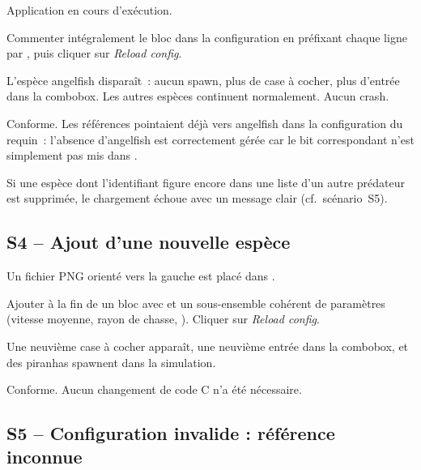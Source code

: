 \begin{description}[leftmargin=3em]
  \item[Préconditions.] Application en cours d'exécution.
  \item[Action.] Commenter intégralement le bloc
    \code{[[species]]}  dans la
    configuration en préfixant chaque ligne par \code{\#},
    puis cliquer sur \emph{Reload config}.
  \item[Attendu.] L'espèce angelfish disparaît~: aucun spawn,
    plus de case à cocher, plus d'entrée dans la combobox.
    Les autres espèces continuent normalement. Aucun crash.
  \item[Observé.] Conforme. Les références 
    pointaient déjà vers angelfish dans la configuration du
    requin~: l'absence d'angelfish est correctement gérée
    car le bit correspondant n'est simplement pas mis dans
    .
  \item[Note.] Si une espèce dont l'identifiant figure encore
    dans une liste  d'un autre prédateur est
    supprimée, le chargement échoue avec un message clair (cf.\
    scénario~S5).
\end{description}

\subsection{S4 -- Ajout d'une nouvelle espèce}

\begin{description}[leftmargin=3em]
  \item[Préconditions.] Un fichier PNG 
    orienté vers la gauche est placé dans .
  \item[Action.] Ajouter à la fin de  un
    bloc \code{[[species]]} avec  et un
    sous-ensemble cohérent de paramètres (vitesse moyenne,
    rayon de chasse, ). Cliquer sur
    \emph{Reload config}.
  \item[Attendu.] Une neuvième case à cocher apparaît, une
    neuvième entrée dans la combobox, et des piranhas spawnent
    dans la simulation.
  \item[Observé.] Conforme. Aucun changement de code C n'a été
    nécessaire.
\end{description}

\subsection{S5 -- Configuration invalide : référence inconnue}

